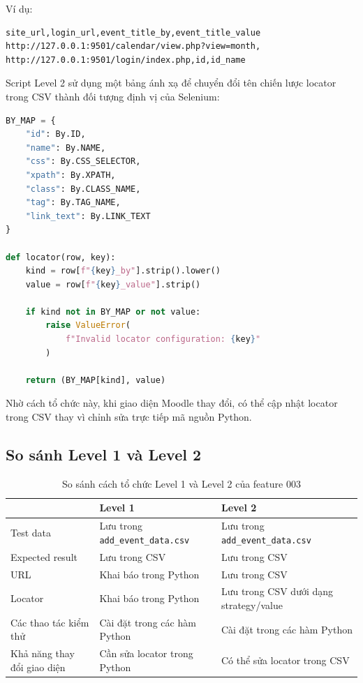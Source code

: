 \documentclass[12pt,a4paper]{article}
\begin{document}
Ví dụ:

\begin{lstlisting}
site_url,login_url,event_title_by,event_title_value
http://127.0.0.1:9501/calendar/view.php?view=month,
http://127.0.0.1:9501/login/index.php,id,id_name
\end{lstlisting}

Script Level 2 sử dụng một bảng ánh xạ để chuyển đổi tên chiến lược locator trong CSV thành đối tượng định vị của Selenium:

\begin{lstlisting}[language=Python]
BY_MAP = {
    "id": By.ID,
    "name": By.NAME,
    "css": By.CSS_SELECTOR,
    "xpath": By.XPATH,
    "class": By.CLASS_NAME,
    "tag": By.TAG_NAME,
    "link_text": By.LINK_TEXT
}

def locator(row, key):
    kind = row[f"{key}_by"].strip().lower()
    value = row[f"{key}_value"].strip()

    if kind not in BY_MAP or not value:
        raise ValueError(
            f"Invalid locator configuration: {key}"
        )

    return (BY_MAP[kind], value)
\end{lstlisting}

Nhờ cách tổ chức này, khi giao diện Moodle thay đổi, có thể cập nhật locator trong CSV thay vì chỉnh sửa trực tiếp mã nguồn Python.

\subsection{So sánh Level 1 và Level 2}

\begin{table}[H]
\centering\small
\begin{tabular}{|L{3.6cm}|L{5.3cm}|L{5.3cm}|}
\hline
{}
& \textbf{Level 1} & \textbf{Level 2} \\ \hline

Test data
& Lưu trong \texttt{add\_event\_data.csv}
& Lưu trong \texttt{add\_event\_data.csv} \\ \hline

Expected result
& Lưu trong CSV
& Lưu trong CSV \\ \hline

URL
& Khai báo trong Python
& Lưu trong CSV \\ \hline

Locator
& Khai báo trong Python
& Lưu trong CSV dưới dạng strategy/value \\ \hline

Các thao tác kiểm thử
& Cài đặt trong các hàm Python
& Cài đặt trong các hàm Python \\ \hline

Khả năng thay đổi giao diện
& Cần sửa locator trong Python
& Có thể sửa locator trong CSV \\ \hline
\end{tabular}
\caption{So sánh cách tổ chức Level 1 và Level 2 của feature 003}
\end{table}
\end{document}
